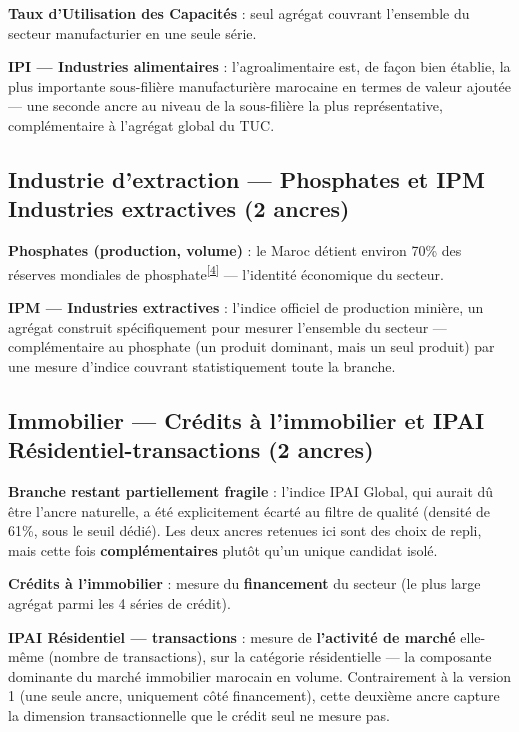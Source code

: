 \documentclass[11pt,a4paper]{article}
\newcommand{\cit}[1]{\textsuperscript{\hyperlink{ref#1}{[#1]}}}
\begin{document}
\textbf{Taux d'Utilisation des Capacités} : seul agrégat couvrant l'ensemble du secteur manufacturier en une seule série.

\textbf{IPI --- Industries alimentaires} : l'agroalimentaire est, de façon bien établie, la plus importante sous-filière manufacturière marocaine en termes de valeur ajoutée --- une seconde ancre au niveau de la sous-filière la plus représentative, complémentaire à l'agrégat global du TUC.

\subsection{Industrie d'extraction --- Phosphates et IPM Industries extractives (2 ancres)}

\textbf{Phosphates (production, volume)} : le Maroc détient environ 70\% des réserves mondiales de phosphate\cit{4} --- l'identité économique du secteur.

\textbf{IPM --- Industries extractives} : l'indice officiel de production minière, un agrégat construit spécifiquement pour mesurer l'ensemble du secteur --- complémentaire au phosphate (un produit dominant, mais un seul produit) par une mesure d'indice couvrant statistiquement toute la branche.

\subsection{Immobilier --- Crédits à l'immobilier et IPAI Résidentiel-transactions (2 ancres)}

\begin{alertebox}
\textbf{Branche restant partiellement fragile} : l'indice IPAI Global, qui aurait dû être l'ancre naturelle, a été explicitement écarté au filtre de qualité (densité de 61\%, sous le seuil dédié). Les deux ancres retenues ici sont des choix de repli, mais cette fois \textbf{complémentaires} plutôt qu'un unique candidat isolé.
\end{alertebox}

\textbf{Crédits à l'immobilier} : mesure du \textbf{financement} du secteur (le plus large agrégat parmi les 4 séries de crédit).

\textbf{IPAI Résidentiel --- transactions} : mesure de \textbf{l'activité de marché} elle-même (nombre de transactions), sur la catégorie résidentielle --- la composante dominante du marché immobilier marocain en volume. Contrairement à la version 1 (une seule ancre, uniquement côté financement), cette deuxième ancre capture la dimension transactionnelle que le crédit seul ne mesure pas.
\end{document}
